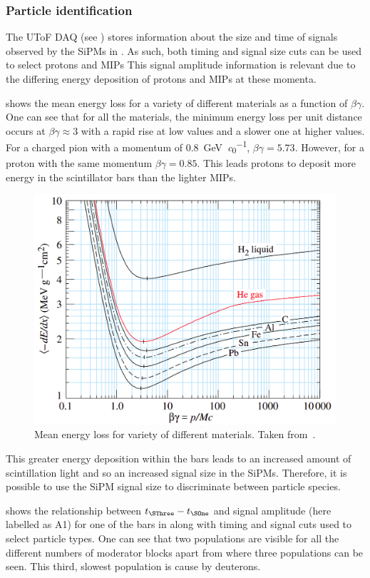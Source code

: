 \subsubsection{Particle identification}
\label{sec:hptpc_beam_flux:methods:s3:pid}

The UToF DAQ (see ) stores information about the size and time of signals observed by the SiPMs in \SThree.
As such, both timing and signal size cuts can be used to select protons and MIPs
This signal amplitude information is relevant due to the differing energy deposition of protons and MIPs at these momenta.

 shows the mean energy loss for a variety of different materials as a function of $\beta \gamma$.
One can see that for all the materials, the minimum energy loss per unit distance occurs at $\beta\gamma \approx 3$ with a rapid rise at low values and a slower one at higher values.
For a charged pion with a momentum of \SI{0.8}{\giga\electronvolt\per\clight}, $\beta\gamma = 5.73$.
However, for a proton with the same momentum $\beta\gamma = 0.85$.
This leads protons to deposit more energy in the scintillator bars than the lighter MIPs.

\begin{figure}[h]
  \centering
  \includegraphics[width=.6\linewidth]{files/figures/hptpc_beam_flux/energyLoss}
  \caption[Mean energy loss for a variety of different materials.]{Mean energy loss for variety of different materials. Taken from~\cite{pdg2020}.}
  \label{fig:energyLoss}
\end{figure}

This greater energy deposition within the bars leads to an increased amount of scintillation light and so an increased signal size in the SiPMs.
Therefore, it is possible to use the SiPM signal size to discriminate between particle species.

 shows the relationship between $t_{\SThree} - t_{\SOne}$ and signal amplitude (here labelled as A1) for one of the bars in \SThree along with timing and signal cuts used to select particle types.
One can see that two populations are visible for all the different numbers of moderator blocks apart from  where three populations can be seen.
This third, slowest population is cause by deuterons.

